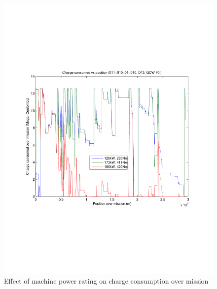 \documentclass{article}
\begin{document}
\begin{figure}[h!]
\centering
\includegraphics[width=\linewidth, clip=true, trim=45 185 65 208]{Figures/Effect_of_machine_power_rating/Charge_consumed_vs_position_(011-010-01-010,D13,GCW_70t).pdf}
\caption{Effect of machine power rating on charge consumption over mission}
\label{chargeMissionMachineRating}
\end{figure}
\end{document}
